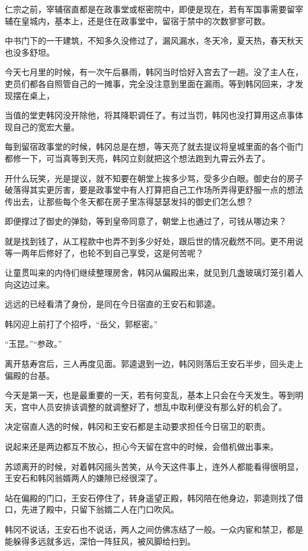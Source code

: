 仁宗之前，宰辅宿直都是在政事堂或枢密院中，即便是现在，若有军国事需要留宰辅在皇城内，基本上，还是住在政事堂中，留宿于禁中的次数寥寥可数。

中书门下的一干建筑，不知多久没修过了，漏风漏水，冬天冷，夏天热，春天秋天也没多舒坦。

今天七月里的时候，有一次午后暴雨，韩冈当时恰好入宫去了一趟。没了主人在，吏员们都各自照管自己的一摊事，完全没注意到里面在漏雨。等到韩冈回来，才发现摆在桌上，

当值的堂吏韩冈没开除他，将其降职调任了。有过当罚，韩冈也没打算用这点事体现自己的宽宏大量。

每到留宿政事堂的时候，韩冈总是在想，等天亮了就去提议将皇城里面的各个衙门都修一下，可当真等到天亮，韩冈立刻就把这个想法跑到九霄云外去了。

开什么玩笑，光是提议，就不知要在朝堂上挨多少骂，受多少白眼。御史台的房子破落得其实更厉害，要是政事堂中有人打算把自己工作场所弄得更舒服一点的想法传出去，让那些每个冬天都在房子里冻得瑟瑟发抖的御史们怎么想？

即便撑过了御史的弹劾，等到皇帝同意了，朝堂上也通过了，可钱从哪边来？

就是找到钱了，从工程款中也弄不到多少好处，跟后世的情况截然不同。更不用说等一两年后修好了，也轮不到自己享受，这是何苦呢？

让童贯叫来的内侍们继续整理房舍，韩冈从偏殿出来，就见到几盏玻璃灯笼引着人向这边过来。

远远的已经看清了身份，是同在今日宿直的王安石和郭逵。

韩冈迎上前打了个招呼，“岳父，郭枢密。”

“玉昆。”“参政。”

离开慈寿宫后，三人再度见面。郭逵退到一边，韩冈则落后王安石半步，回头走上偏殿的台基。

今天是第一天，也是最重要的一天，若有何变乱，基本上只会在今天发生。等到明天，宫中人员安排该调整的就调整好了，想乱中取利便没有那么好的机会了。

决定宿直人选的时候，韩冈和王安石都是主动要求担任今日宿卫的职责。

说起来还是两边都互不放心，担心今天留在宫中的时候，会借机做出事来。

苏颂离开的时候，对着韩冈摇头苦笑，从今天这件事上，连外人都能看得很明显，王安石和韩冈翁婿两人的嫌隙已经很深了。

站在偏殿的门口，王安石停住了，转身遥望正殿，韩冈陪在他身边，郭逵则找了借口，先进了殿中，只留下翁婿二人在门口吹风。

韩冈不说话，王安石也不说话，两人之间仿佛冻结了一般。一众内宦和禁卫，都是能躲得多远就多远，深怕一阵狂风，被风脚给扫到。

